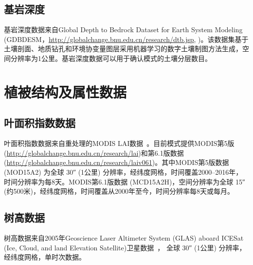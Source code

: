 \subsection{基岩深度}\label{基岩深度}

基岩深度数据来自Global Depth to Bedrock Dataset for Earth System Modeling (GDBDESM，\url{http://globalchange.bnu.edu.cn/research/dtb.jsp}, \citet{shangguan2017mapping})。该数据集基于土壤剖面、地质钻孔和环境协变量图层采用机器学习的数字土壤制图方法生成，空间分辨率为1公里。基岩深度数据可以用于确认模式的土壤分层数目。


\section{植被结构及属性数据}\label{植被结构及属性数据}
\subsection{叶面积指数数据}\label{叶面积指数数据}
叶面积指数数据来自重处理的MODIS LAI数据~\citep{yuan2011reprocessing,lin2023ReprocessedMODISVersion}。目前模式提供MODIS第5版(\url{http://globalchange.bnu.edu.cn/research/lai})和第6.1版数据(\url{http://globalchange.bnu.edu.cn/research/laiv061})。其中MODIS第5版数据 (MOD15A2) 为全球 \ang{;;30} (1公里) 分辨率，经纬度网格，时间覆盖2000--2016年，时间分辨率为每8天。MODIS第6.1版数据 (MCD15A2H)，空间分辨率为全球 \ang{;;15} (约500米)，经纬度网格，时间覆盖从2000年至今，时间分辨率每8天或每月。


\subsection{树高数据}\label{树高数据}
树高数据来自2005年Geoscience Laser Altimeter System (GLAS) aboard ICESat 
(Ice, Cloud, and land Elevation Satellite)卫星数据~\citep{simard2011mapping}，
全球 \ang{;;30} (1公里) 分辨率，经纬度网格，单时次数据。

